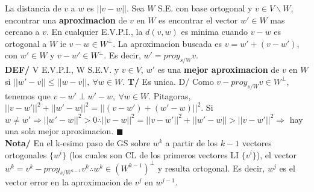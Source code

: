 \documentclass[10pt,a4paper]{article}
\newcommand*{\QEDA}{\null\nobreak\hfill\ensuremath{\blacksquare}}
\begin{document}
\newpage
La distancia de $v$ a $w$ es $||v-w||$. Sea $W$ S.E. con base ortogonal y $v \in V \backslash W$, encontrar una \textbf{aproximacion} de $v$ en $W$ es encontrar el vector $w' \in W$ mas cercano a $v$. En cualquier E.V.P.I., la $d(v,w)$ es minima cuando $v-w$ es ortogonal a $W$ ie $v-w \in W^\perp$. La aproximacion buscada es $v = w' + (v - w')$, con $w' \in W$ y $v-w' \in W^\perp$. Es decir, $w' = proy_{s/W}v$.\\
\textbf{DEF/} V E.V.P.I., W S.E.V. y $v \in V$, $w'$ es una \textbf{mejor aproximacion} de $v$ en $W$ si $||w'-v|| \leq ||w-v||,\ \forall w \in W$.
\textbf{T/} Es unica. D/ Como $v-proy_{s/W} v \in W^\perp$, tenemos que $v-w' \perp w'-w,\ \forall w \in W$. Pitagoras, $||v-w'||^2 + ||w'-w||^2 = ||(v-w')+(w'-w)||^2$. Si $w \not = w' \Rightarrow ||w'-w||^2>0 \therefore ||v-w||^2 = ||v-w'||^2+||w'-w|| > ||v-w'||^2 \Rightarrow $ hay una sola mejor aproximacion. \QEDA\\
\textbf{Nota/} En el k-esimo paso de GS sobre $w^k$ a partir de los $k-1$ vectores ortogonales $\{w^i\}$ (los cuales son CL de los primeros vectores LI $\{v^i\}$), el vector $w^k = v^k - proy_{s/W^{k-1}} v^k \therefore w^k \in ({W^{k-1}})^\perp$ y resulta ortogonal. Es decir, $w^j$ es el vector error en la aproximacion de $v^j$ en $w^{j-1}$.

\dotfill\\
\end{document}
